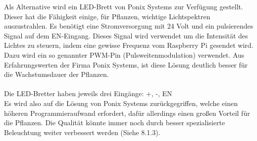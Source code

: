 \newpage
{}
Als Alternative wird ein LED-Brett von Ponix Systems zur Verfügung gestellt. Dieser hat die Fähigkeit einige, für Pflanzen, wichtige Lichtspektren auszustrahlen. Es benötigt eine Stromversorgung mit 24 Volt und ein pulsierendes Signal auf dem EN-Eingang. Dieses Signal wird verwendet um die Intensität des Lichtes zu steuern, indem eine gewisse Frequenz vom Raspberry Pi gesendet wird. Dazu wird ein so genannter \gls{PWM}-Pin (Pulsweitenmodulation) verwendet. Aus Erfahrungswerten der Firma Ponix Systems, ist diese Lösung deutlich besser für die Wachstumsdauer der Pflanzen. \cite{osram, elektrJournal} \\ \mbox{} \\
Die LED-Bretter haben jeweils drei Eingänge: +, -, EN \\
Es wird also auf die Lösung von Ponix Systems zurückgegriffen, welche einen höheren Programmieraufwand erfordert, dafür allerdings einen großen Vorteil für die Pflanzen. Die Qualität könnte immer noch durch besser spezialisierte Beleuchtung weiter verbessert werden (Siehe 8.1.3). 
